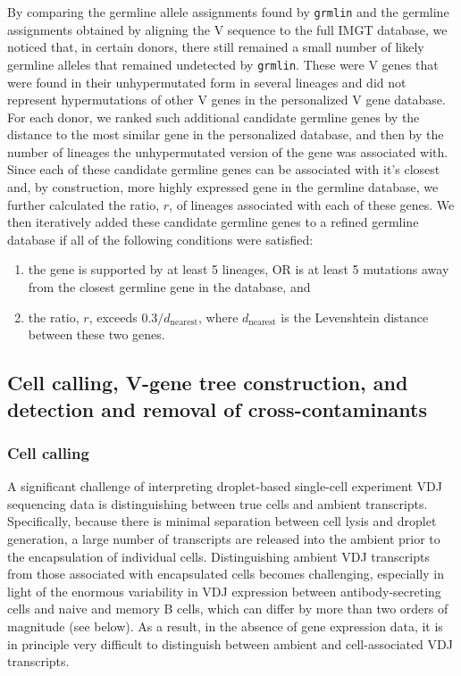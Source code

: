 By comparing the germline allele assignments found by \verb|grmlin| and the germline assignments obtained by aligning the V sequence to the full IMGT database, we noticed that, in certain donors, there still remained a small number of likely germline alleles that remained undetected by \verb|grmlin|. These were V genes that were found in their unhypermutated form in several lineages and did not represent hypermutations of other V genes in the personalized V gene database. For each donor, we ranked such additional candidate germline genes by the distance to the most similar gene in the personalized database, and then by the number of lineages the unhypermutated version of the gene was associated with. Since each of these candidate germline genes can be associated with it's closest and, by construction, more highly expressed gene in the germline database, we further calculated the ratio, $r$, of lineages associated with each of these genes. We then iteratively added these candidate germline genes to a refined germline database if all of the following conditions were satisfied:
\begin{enumerate}
    \item the gene is supported by at least 5 lineages, OR is at least 5 mutations away from the closest germline gene in the database, and
    \item the ratio, $r$, exceeds $0.3/d_\mathrm{nearest}$, where $d_\mathrm{nearest}$ is the Levenshtein distance between these two genes.
\end{enumerate}


\subsection{Cell calling, V-gene tree construction, and detection and removal of cross-contaminants}

\subsubsection{Cell calling}
\label{sec:cell-calling}
\noindent A significant challenge of interpreting droplet-based single-cell experiment VDJ sequencing data is distinguishing between true cells and ambient transcripts. Specifically, because there is minimal separation between cell lysis and droplet generation, a large number of transcripts are released into the ambient prior to the encapsulation of individual cells. Distinguishing ambient VDJ transcripts from those associated with encapsulated cells becomes challenging, especially in light of the enormous variability in VDJ expression between antibody-secreting cells and naive and memory B cells, which can differ by more than two orders of magnitude (see  below). As a result, in the absence of gene expression data, it is in principle very difficult to distinguish between ambient and cell-associated VDJ transcripts. 

